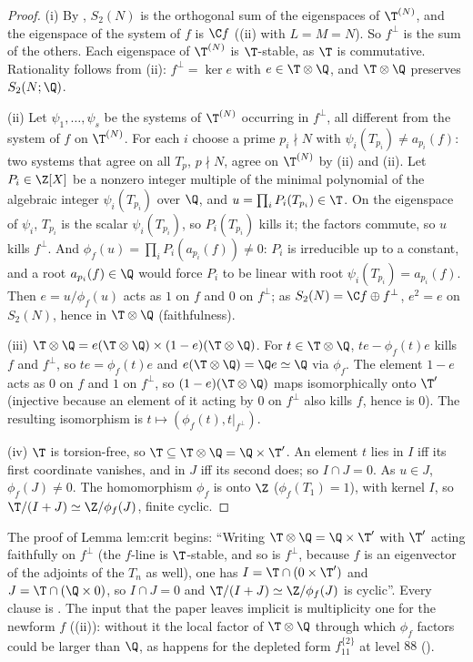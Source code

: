 \begin{proof}
(i) By , $S_2(N)$ is the orthogonal sum of the eigenspaces of $\T^{(N)}$, and the eigenspace of the system of $f$ is $\C f$ ((ii) with $L=M=N$).
So $f^\perp$ is the sum of the others. Each eigenspace of $\T^{(N)}$ is $\T$-stable, as $\T$ is commutative. Rationality follows from (ii): $f^\perp=\ker e$ with $e\in\T\otimes\Q$, and $\T\otimes\Q$
preserves $S_2(N;\Q)$.

(ii) Let $\psi_1,\dots,\psi_s$ be the systems of $\T^{(N)}$ occurring in $f^\perp$, all different from the system of $f$ on $\T^{(N)}$. For each $i$ choose a prime $p_i\nmid N$ with $\psi_i(T_{p_i})\ne a_{p_i}(f)$: two
systems that agree on all $T_p$, $p\nmid N$, agree on $\T^{(N)}$ by (ii) and (ii). Let $P_i\in\Z[X]$ be a nonzero integer multiple of the minimal
polynomial of the algebraic integer $\psi_i(T_{p_i})$ over $\Q$, and $u=\prod_iP_i(T_{p_i})\in\T$. On the eigenspace of $\psi_i$, $T_{p_i}$ is the scalar $\psi_i(T_{p_i})$, so $P_i(T_{p_i})$ kills it; the factors
commute, so $u$ kills $f^\perp$. And $\phi_f(u)=\prod_iP_i(a_{p_i}(f))\ne0$: $P_i$ is irreducible up to a constant, and a root $a_{p_i}(f)\in\Q$ would force $P_i$ to be linear with root $\psi_i(T_{p_i})=a_{p_i}(f)$.
Then $e=u/\phi_f(u)$ acts as $1$ on $f$ and $0$ on $f^\perp$; as $S_2(N)=\C f\oplus f^\perp$, $e^2=e$ on $S_2(N)$, hence in $\T\otimes\Q$ (faithfulness).

(iii) $\T\otimes\Q=e(\T\otimes\Q)\times(1-e)(\T\otimes\Q)$. For $t\in\T\otimes\Q$, $te-\phi_f(t)e$ kills $f$ and $f^\perp$, so $te=\phi_f(t)e$ and $e(\T\otimes\Q)=\Q e\simeq\Q$ via $\phi_f$. The element $1-e$ acts as $0$ on
$f$ and $1$ on $f^\perp$, so $(1-e)(\T\otimes\Q)$ maps isomorphically onto $\T'$ (injective because an element of it acting by $0$ on $f^\perp$ also kills $f$, hence is $0$). The resulting
isomorphism is $t\mapsto(\phi_f(t),t|_{f^\perp})$.

(iv) $\T$ is torsion-free, so $\T\subseteq\T\otimes\Q=\Q\times\T'$. An element $t$ lies in $I$ iff its first coordinate vanishes, and in $J$ iff its second does; so $I\cap J=0$. As $u\in J$, $\phi_f(J)\ne0$.
The homomorphism $\phi_f$ is onto $\Z$ ($\phi_f(T_1)=1$), with kernel $I$, so $\T/(I+J)\simeq\Z/\phi_f(J)$, finite cyclic.
\end{proof}

\begin{paperlink}\label{pl:hecke:splitting}
The proof of Lemma lem:crit begins: ``Writing $\T\otimes\Q=\Q\times\T'$ with $\T'$ acting faithfully on $f^\perp$ (the $f$-line is $\T$-stable, and so is $f^\perp$, because $f$ is an eigenvector of the
adjoints of the $T_n$ as well), one has $I=\T\cap(0\times\T')$ and $J=\T\cap(\Q\times0)$, so $I\cap J=0$ and $\T/(I+J)\simeq\Z/\phi_f(J)$ is cyclic''. Every clause is . The
input that the paper leaves implicit is multiplicity one for the newform $f$ ((ii)): without it the local factor of $\T\otimes\Q$ through which $\phi_f$ factors could be
larger than $\Q$, as happens for the depleted form $f_{11}^{\{2\}}$ at level $88$ ().
\end{paperlink}

